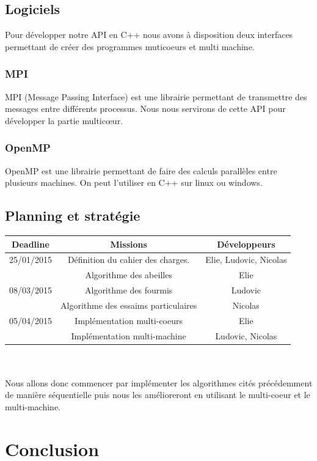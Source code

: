 \documentclass[12pt]{article}
\begin{document}
\subsection{Logiciels}
Pour développer notre API en C++ nous avons à disposition deux interfaces permettant de créer des programmes muticoeurs et multi machine.


\subsubsection{MPI}
MPI\cite{mpi} (Message Passing Interface) est une librairie permettant de transmettre des messages entre différents processus. Nous nous servirons de cette API pour développer la partie multicœur.

\subsubsection{OpenMP}
OpenMP est une librairie permettant de faire des calculs parallèles entre plusieurs machines. On peut l'utiliser en C++ sur linux ou windows.

\subsection{Planning et stratégie}
\begin{tabular}{|c|c|c|}
\hline
Deadline & Missions & Développeurs \\
\hline
25/01/2015 & Définition du cahier des charges. & Elie, Ludovic, Nicolas\\
\hline
 & Algorithme des abeilles & Elie\\
08/03/2015 & Algorithme des fourmis & Ludovic\\
 & Algorithme des essaims particulaires & Nicolas\\
\hline
05/04/2015 & Implémentation multi-coeurs & Elie\\
 & Implémentation multi-machine & Ludovic, Nicolas\\
 \hline
\end{tabular}
\\\\
Nous allons donc commencer par implémenter les algorithmes cités précédemment de manière séquentielle puis nous les amélioreront en utilisant le multi-coeur et le multi-machine.

\section*{Conclusion}
\end{document}
